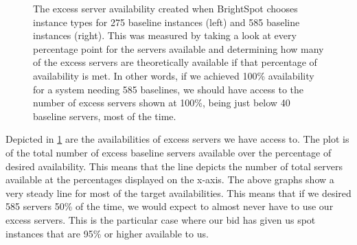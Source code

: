 \documentclass[thesis,proposal]{umassthesis}  %
\begin{document}
\begin{figure}
\begin{minipage}{0.49\textwidth}
    \end{minipage}
    \caption{The excess server availability created when BrightSpot chooses instance types for 275 baseline instances (left) and 585 baseline instances (right). This was measured by taking a look at every percentage point for the servers available and determining how many of the excess servers are theoretically available if that percentage of availability is met. In other words, if we achieved 100\% availability for a system needing 585 baselines, we should have access to the number of excess servers shown at 100\%, being just below 40 baseline servers, most of the time.}
    \label{Fig:excessservers}
\end{figure}

Depicted in \ref{Fig:excessservers} are the availabilities of excess servers we have access to. The plot is of the total number of excess baseline servers available over the percentage of desired availability. This means that the line depicts the number of total servers available at the percentages displayed on the x-axis. The above graphs show a very steady line for most of the target availabilities. This means that if we desired 585 servers 50\% of the time, we would expect to almost never have to use our excess servers. This is the particular case where our bid has given us spot instances that are 95\% or higher available to us. \par
\end{document}
